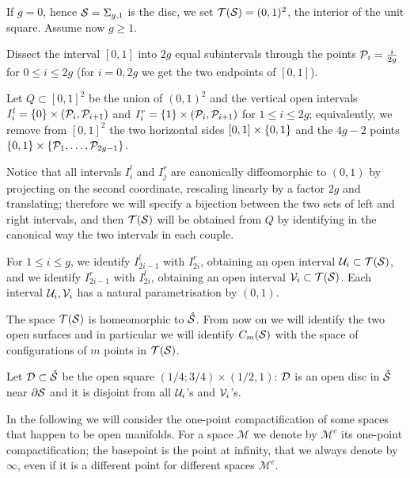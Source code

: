 \begin{defn}
\label{defn:Tsg}
If $g=0$, hence $\S=\sg$ is the disc, we set $\T(\S)=(0,1)^2$, the interior of the unit square. Assume
now $g\geq 1$.

Dissect the interval $[0,1]$ into $2g$ equal subintervals through the points $\cP_i=\frac{i}{2g}$ for $0\leq i\leq 2g$
(for $i=0,2g$ we get the two endpoints of $[0,1]$).

Let $Q\subset[0,1]^2$ be the union of $(0,1)^2$ and the vertical open intervals
$I_i^l=\set{0}\times (\cP_i,\cP_{i+1})$ and $I_i^r=\set{1}\times (\cP_i,\cP_{i+1})$ for $1\leq i\leq 2g$;
equivalently, we remove from $[0,1]^2$ the two horizontal sides
$[0,1]\times\set{0,1}$ and the $4g-2$ points $\set{0,1}\times \set{\cP_1,\dots,\cP_{2g-1}}$.

Notice that all intervals $I_i^l$ and $I_j^r$ are
canonically diffeomorphic
to $(0,1)$ by projecting on the second coordinate, rescaling linearly by a factor $2g$
and translating; therefore we will specify a bijection
between the two sets of left and right intervals, and then $\T(\S)$ will be obtained from $Q$
by identifying in the canonical way the two intervals in each couple.

For $1\leq i\leq g$, we identify $I^l_{2i-1}$ with $I^r_{2i}$, obtaining an open interval $\U_i\subset\T(\S)$,
and we identify $I^r_{2i-1}$ with $I^l_{2i}$, obtaining an open interval $\V_i\subset\T(\S)$.
Each interval $\U_i,\V_i$ has a natural parametrisation by $(0,1)$.

The space $\T(\S)$ is homeomorphic to $\mrS$. From now
on we will identify the two open surfaces and in particular we will identify $\cms$ with the
space of configurations of $m$ points in $\T(\S)$.

Let $\D\subset\mrS$ be the open square $(1/4;3/4)\times(1/2,1)$:
$\D$ is an open disc in $\mrS$ near $\partial\S$ and 
it is disjoint from all $\U_i$'s and $\V_i$'s.
\end{defn}

In the following we will consider the one-point compactification of some spaces that
happen to be open manifolds. For a space $\mathcal{M}$ we denote by $\mathcal{M}^c$ its one-point
compactification; the basepoint is the point at infinity, that we always denote by $\infty$, even
if it is a different point for different spaces $\mathcal{M}^c$.

